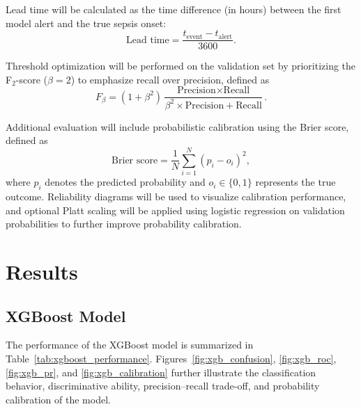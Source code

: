 \documentclass[conference]{IEEEtran}
\begin{document}
Lead time will be calculated as the time difference (in hours) between the first model alert and the true sepsis onset:
\begin{equation}
\text{Lead time} = \frac{t_{\text{event}} - t_{\text{alert}}}{3600}.
\end{equation}

Threshold optimization will be performed on the validation set by prioritizing the F$_2$-score ($\beta = 2$) to emphasize recall over precision, defined as
\begin{equation}
F_\beta = (1 + \beta^2)\frac{\text{Precision} \times \text{Recall}}{\beta^2 \times \text{Precision} + \text{Recall}}.
\end{equation}

Additional evaluation will include probabilistic calibration using the Brier score, defined as
\begin{equation}
\text{Brier score} = \frac{1}{N} \sum_{i=1}^{N} (p_i - o_i)^2,
\end{equation}
where $p_i$ denotes the predicted probability and $o_i \in \{0,1\}$ represents the true outcome.
Reliability diagrams will be used to visualize calibration performance, and optional Platt scaling will be applied using logistic regression on validation probabilities to further improve probability calibration.

\section{Results}

\subsection{XGBoost Model}

The performance of the XGBoost model is summarized in Table~\ref{tab:xgboost_performance}. Figures~\ref{fig:xgb_confusion}, \ref{fig:xgb_roc}, \ref{fig:xgb_pr}, and \ref{fig:xgb_calibration} further illustrate the classification behavior, discriminative ability, precision--recall trade-off, and probability calibration of the model.
\end{document}
